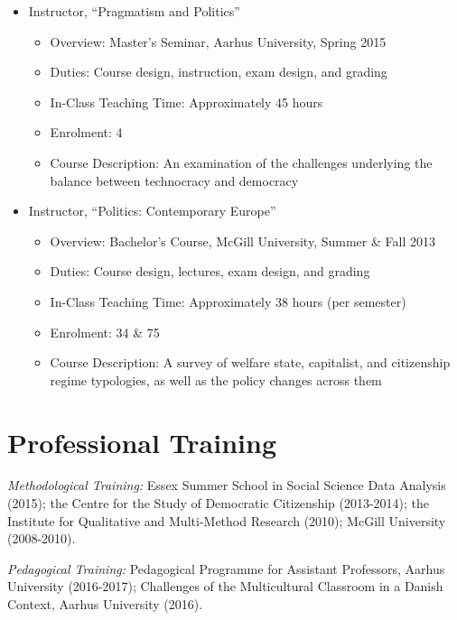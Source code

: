 \documentclass[letterpaper,fontsize=10pt]{scrartcl}
\begin{document}
\begin{itemize}[noitemsep]
\begin{itemize}[noitemsep]
			\end{itemize}
			\item Instructor, “Pragmatism and Politics”
			\begin{itemize}[noitemsep]
					\item Overview: Master’s Seminar, Aarhus University, Spring 2015
					\item Duties: Course design, instruction, exam design, and grading
          \item In-Class Teaching Time: Approximately 45 hours
					\item Enrolment: 4
					\item Course Description: An examination of the challenges underlying the balance between technocracy and democracy
			\end{itemize}
			\item Instructor, “Politics: Contemporary Europe”
			\begin{itemize}[noitemsep]
					\item Overview: Bachelor’s Course, McGill University, Summer \& Fall 2013
					\item Duties: Course design, lectures, exam design, and grading
          \item In-Class Teaching Time: Approximately 38 hours (per semester)
					\item Enrolment: 34 \& 75
					\item Course Description: A survey of welfare state, capitalist, and citizenship regime typologies, as well as the policy changes across them
			\end{itemize}
	\end{itemize}

	\vspace{-1em}
\section{Professional Training}
\vspace{-.5em}

{} \textit{Methodological Training:} Essex Summer School in Social Science Data Analysis (2015); the Centre for the Study of Democratic Citizenship (2013-2014); the Institute for Qualitative and Multi-Method Research (2010); McGill University (2008-2010).\\[-1ex]

{} \textit{Pedagogical Training:} Pedagogical Programme for Assistant Professors, Aarhus University (2016-2017); Challenges of the Multicultural Classroom in a Danish Context, Aarhus University (2016).\\[-1ex]
\end{document}
